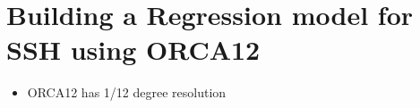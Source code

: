 
%

\section{Building a Regression model for SSH using ORCA12}
\label{sec:3_ORCA12_REG.tex}

\begin{itemize}
    \item ORCA12 has 1/12 degree resolution
\end{itemize}




%
